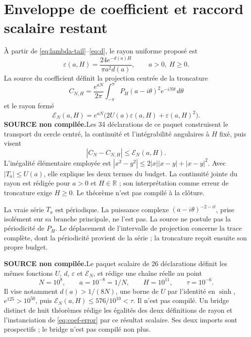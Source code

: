 \documentclass[11pt,a4paper]{article}
\theoremstyle{remark}
\newcommand{\R}{\mathbb R}
\newcommand{\source}{\textbf{SOURCE non compilée.}\space}
\begin{document}
\section{Enveloppe de coefficient et raccord scalaire restant}\label{sec:radius}
À partir de \eqref{eq:lambda-tail}--\eqref{eq:d}, le rayon uniforme proposé est
\begin{equation}\label{eq:eps}
\varepsilon(a,H)=\frac{24e^{-d(a)H}}{\pi a^2d(a)},\qquad a>0,\ H\ge0.
\end{equation}
La source du coefficient définit la projection centrée de la troncature
\[
C_{N,H}=\frac{e^{aN}}{2\pi}\int_{-\pi}^{\pi}
P_H(a-i\theta)^2e^{-iN\theta}\,d\theta
\]
et le rayon fermé
\begin{equation}\label{eq:E-mellin}
\mathcal E_N(a,H)=e^{aN}\bigl(2U(a)\varepsilon(a,H)
+\varepsilon(a,H)^2\bigr).
\end{equation}
\source Les 34 déclarations de ce paquet construisent le transport du
cercle centré, la continuité et l'intégrabilité angulaires à $H$ fixé,
puis visent
\begin{equation}\label{eq:coef-error}
|C_N-C_{N,H}|\le\mathcal E_N(a,H).
\end{equation}
L'inégalité élémentaire employée est
$|x^2-y^2|\le2|x||x-y|+|x-y|^2$. Avec $|T_a|\le U(a)$, elle explique
les deux termes du budget. La continuité jointe du rayon est rédigée pour
$a>0$ et $H\in\R$ ; son interprétation comme erreur de troncature exige
$H\ge0$. Le théorème n'est pas compilé à la clôture.

La vraie série $T_a$ est périodique. La puissance complexe
$(a-i\theta)^{-2-it}$, prise isolément sur sa branche principale, ne l'est
pas. La source ne postule pas la périodicité de $P_H$. Le déplacement de
l'intervalle de projection concerne la trace complète, dont la périodicité
provient de la série ; la troncature reçoit ensuite son propre budget.

\source Le paquet scalaire de 26 déclarations définit les mêmes fonctions
$U$, $d$, $\varepsilon$ et $\mathcal E_N$, et rédige une chaîne réelle au
point
\begin{equation}\label{eq:point}
N=10^8,\qquad a=10^{-8}=1/N,\qquad H=10^{11},\qquad\tau=10^{-6}.
\end{equation}
Il vise notamment $d(a)>1/(8N)$, une borne de $U$ par l'identité en
$\sinh$, $e^{125}>10^{50}$, puis
$\mathcal E_N(a,H)\le576/10^{10}<\tau$.
Il n'est pas compilé. Un bridge distinct de huit théorèmes rédige les
égalités des deux définitions de rayon et l'instanciation de
\eqref{eq:coef-error} par ce résultat scalaire. Ses deux imports sont
prospectifs ; le bridge n'est pas compilé non plus.
\end{document}
